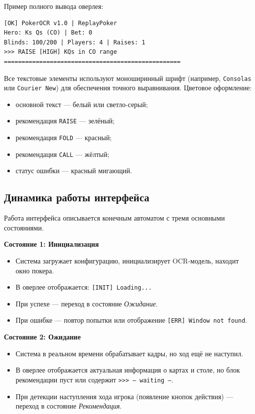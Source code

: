 Пример полного вывода оверлея:
\begin{verbatim}
[OK] PokerOCR v1.0 | ReplayPoker
Hero: Ks Qs (CO) | Bet: 0
Blinds: 100/200 | Players: 4 | Raises: 1
>>> RAISE [HIGH] KQs in CO range
==================================================
\end{verbatim}

Все текстовые элементы используют моноширинный шрифт (например, \texttt{Consolas} или \texttt{Courier New}) для обеспечения точного выравнивания. Цветовое оформление:
\begin{itemize}
    \item основной текст --- белый или светло-серый;
    \item рекомендация \texttt{RAISE} --- зелёный;
    \item рекомендация \texttt{FOLD} --- красный;
    \item рекомендация \texttt{CALL} --- жёлтый;
    \item статус ошибки --- красный мигающий.
\end{itemize}

\subsection{Динамика работы интерфейса}

Работа интерфейса описывается конечным автоматом с тремя основными состояниями.

\textbf{Состояние 1: Инициализация}
\begin{itemize}
    \item Система загружает конфигурацию, инициализирует OCR-модель, находит окно покера.
    \item В оверлее отображается: \texttt{[INIT] Loading...}
    \item При успехе --- переход в состояние \textit{Ожидание}.
    \item При ошибке --- повтор попытки или отображение \texttt{[ERR] Window not found}.
\end{itemize}

\textbf{Состояние 2: Ожидание}
\begin{itemize}
    \item Система в реальном времени обрабатывает кадры, но ход ещё не наступил.
    \item В оверлее отображается актуальная информация о картах и столе, но блок рекомендации пуст или содержит \texttt{>>> -- waiting --}.
    \item При детекции наступления хода игрока (появление кнопок действия) --- переход в состояние \textit{Рекомендация}.
\end{itemize}

